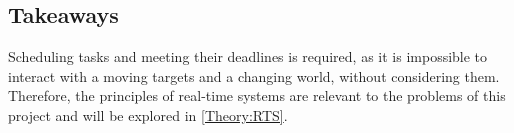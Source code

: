 \subsection{Takeaways}
Scheduling tasks and meeting their deadlines is required, as it is impossible to interact with a moving targets and a changing world, without considering them.
Therefore, the principles of real-time systems are relevant to the problems of this project and will be explored in \autoref{Theory:RTS}.

